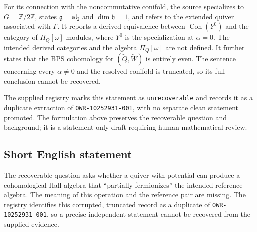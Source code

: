 \documentclass[11pt]{article}
\begin{document}
For its connection with the noncommutative conifold, the source specializes to \(G=\mathbb Z/2\mathbb Z\), states \(\mathfrak g=\mathfrak{sl}_2\) and \(\dim\mathfrak h=1\), and refers to the extended quiver associated with \(\Gamma\). It reports a derived equivalence between \(\operatorname{Coh}(Y^0)\) and the category of \(\Pi_Q[\omega]\)-modules, where \(Y^0\) is the specialization at \(\alpha=0\). The intended derived categories and the algebra \(\Pi_Q[\omega]\) are not defined. It further states that the BPS cohomology for \((\widetilde Q,\widetilde W)\) is entirely even. The sentence concerning every \(\alpha\ne0\) and the resolved conifold is truncated, so its full conclusion cannot be recovered.

The supplied registry marks this statement as \texttt{unrecoverable} and records it as a duplicate extraction of \texttt{OWR-10252931-001}, with no separate clean statement promoted. The formulation above preserves the recoverable question and background; it is a statement-only draft requiring human mathematical review.
\subsection{Short English statement}
The recoverable question asks whether a quiver with potential can produce a cohomological Hall algebra that ``partially fermionizes'' the intended reference algebra. The meaning of this operation and the reference pair are missing. The registry identifies this corrupted, truncated record as a duplicate of \texttt{OWR-10252931-001}, so a precise independent statement cannot be recovered from the supplied evidence.
\end{document}
